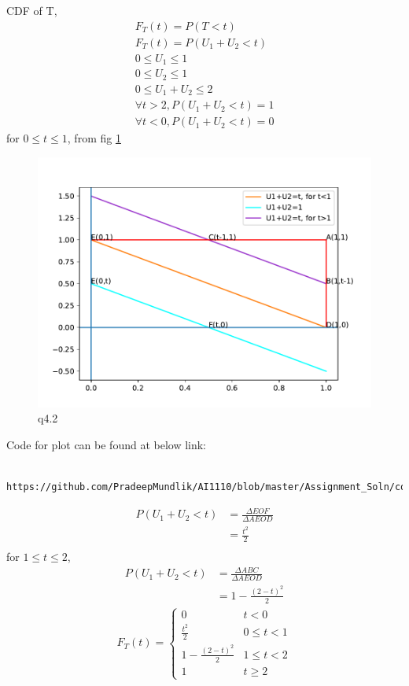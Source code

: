 \documentclass[journal,12pt,twocolumn]{IEEEtran}
\renewcommand\thesection{\arabic{section}}
\begin{document}
\begin{enumerate}[label=\thesection.\arabic*
,ref=\thesection.\theenumi]
CDF of T, 
\begin{align}
	F_T(t) = P(T<t) \\
	F_T(t) = P(U_1+U_2<t) \\
	0 \leq U_1 \leq 1 \\
	0 \leq U_2 \leq 1 \\
	0 \leq U_1 + U_2 \leq 2 \\
	\forall t>2, P(U_1+U_2<t) = 1 \\
	\forall t<0, P(U_1+U_2<t) = 0 
\end{align}
for $0 \leq t \leq 1$,
from fig \ref*{fig:q4_2}
\begin{figure}[h]
	\centering
	\includegraphics[width=\columnwidth]{figs/4/q4_2.pdf}
	 \caption{q4.2}
	\label{fig:q4_2}    
\end{figure}
Code for plot can be found at below link:
\begin{lstlisting}
	https://github.com/PradeepMundlik/AI1110/blob/master/Assignment_Soln/codes/4/q4_2.py
\end{lstlisting}
\begin{align}
	P(U_1+U_2 <t) &= \frac{\Delta EOF}{\Delta AEOD}\\
	 &= \frac{t^2}{2} \\
\end{align}
for $1 \leq t \leq 2$,
\begin{align}
	P(U_1+U_2 <t) &= \frac{\Delta ABC}{\Delta AEOD}\\
	 &= 1 - \frac{(2-t)^2}{2} 
\end{align}
\begin{align}
	 F_T(t) = 
	 \begin{cases}
		0 & t<0 \\
		\frac{t^2}{2} & 0 \leq t < 1 \\
		1 - \frac{(2-t)^2}{2} & 1 \leq t < 2 \\
		1 & t \geq 2
	 \end{cases}
\end{align}


\end{enumerate}
\end{document}
